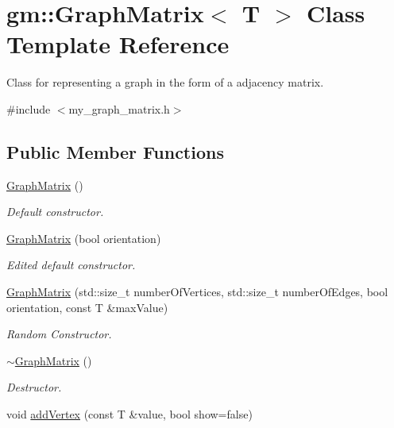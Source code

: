 \hypertarget{classgm_1_1_graph_matrix}{}\section{gm\+:\+:Graph\+Matrix$<$ T $>$ Class Template Reference}
\label{classgm_1_1_graph_matrix}


Class for representing a graph in the form of a adjacency matrix.  




{\ttfamily \#include $<$my\+\_\+graph\+\_\+matrix.\+h$>$}

\subsection*{Public Member Functions}
\begin{DoxyCompactItemize}
\item 
\mbox{\hyperlink{classgm_1_1_graph_matrix_a8f4f156e67d7425f1cc5784384a83757}{Graph\+Matrix}} ()
\begin{DoxyCompactList}\small\item\em Default constructor. \end{DoxyCompactList}\item 
\mbox{\hyperlink{classgm_1_1_graph_matrix_a24ab316e39e3a26c9208c81af0e3e48d}{Graph\+Matrix}} (bool orientation)
\begin{DoxyCompactList}\small\item\em Edited default constructor. \end{DoxyCompactList}\item 
\mbox{\hyperlink{classgm_1_1_graph_matrix_a091be187f54bd8fc750696c4e97e9552}{Graph\+Matrix}} (std\+::size\+\_\+t number\+Of\+Vertices, std\+::size\+\_\+t number\+Of\+Edges, bool orientation, const T \&max\+Value)
\begin{DoxyCompactList}\small\item\em Random Constructor. \end{DoxyCompactList}\item 
\mbox{\hyperlink{classgm_1_1_graph_matrix_a3b0993020ce3351d0ec4b7fe2adc2580}{$\sim$\+Graph\+Matrix}} ()
\begin{DoxyCompactList}\small\item\em Destructor. \end{DoxyCompactList}\item 
void \mbox{\hyperlink{classgm_1_1_graph_matrix_a300259b6a1b30f01d5084b48b22a83b8}{add\+Vertex}} (const T \&value, bool show=false)

\end{DoxyCompactItemize}
